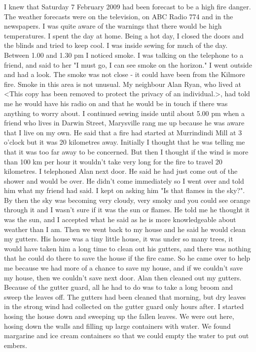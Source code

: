 \documentclass[a4paper]{article}
\begin{document}
    I knew that Saturday 7 February 2009 had been forecast to be a high fire danger. The weather forecasts were on the television, on ABC Radio 774 and in the newspapers. I was quite aware of the warnings that there would be high temperatures.
    I spent the day at home. Being a hot day, I closed the doors and the blinds and tried to keep cool. I was inside sewing for much of the day. Between 1.00 and 1.30 pm I noticed smoke. I was talking on the telephone to a friend, and said to her "I must go, I can see smoke on the horizon." I went outside and had a look. The smoke was not close - it could have been from the Kilmore fire. Smoke in this area is not unusual.
    My neighbour Alan Ryan, who lived at <This copy has been removed to protect the privacy of an individual.>, had told me he would have his radio on and that he would be in touch if there was anything to worry about.
    I continued sewing inside until about 5.00 pm when a friend who lives in Darwin Street, Marysville rang me up because he was aware that I live on my own. He said that a fire had started at Murrindindi Mill at 3 o'clock but it was 20 kilometres away. Initially I thought that he was telling me that it was too far away to be concerned. But then I thought if the wind is more than 100 km per hour it wouldn't take very long for the fire to travel 20 kilometres.
    I telephoned Alan next door. He said he had just come out of the shower and would be over. He didn't come immediately so I went over and told him what my friend had said. I kept on asking him "Is that flames in the sky?". By then the sky was becoming very cloudy, very smoky and you could see orange through it and I wasn't sure if it was the sun or flames. He told me he thought it was the sun, and I accepted what he said as he is more knowledgeable about weather than I am.
    Then we went back to my house and he said he would clean my gutters. His house was a tiny little house, it was under so many trees, it would have taken him a long time to clean out his gutters, and there was nothing that he could do there to save the house if the fire came. So he came over to help me because we had more of a chance to save my house, and if we couldn't save my house, then we couldn't save next door.
    Alan then cleaned out my gutters. Because of the gutter guard, all he had to do was to take a long broom and sweep the leaves off. The gutters had been cleaned that morning, but dry leaves in the strong wind had collected on the gutter guard only hours after. I started hosing the house down and sweeping up the fallen leaves. We were out here, hosing down the walls and filling up large containers with water. We found margarine and ice cream containers so that we could empty the water to put out embers.
\end{document}
